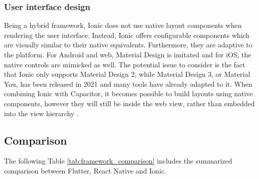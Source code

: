 \subsubsection*{User interface design}

Being a hybrid framework, Ionic does not use native layout components when rendering the user interface. Instead, Ionic offers configurable components which are visually similar to their native equivalents. Furthermore, they are adaptive to the platform. For Android and web, Material Design is imitated and for iOS, the native controls are mimicked as well. The potential issue to consider is the fact that Ionic only supports Material Design 2, while Material Design 3, or Material You, has been released in 2021 and many tools have already adapted to it. When combining Ionic with Capacitor, it becomes possible to build layouts using native components, however they will still be inside the web view, rather than embedded into the view hierarchy \cite{ionic_docs_core_concepts,ionic_blog_capacitor}.

\subsection{Comparison}

The following Table \ref{tab:framework_comparison} includes the summarized comparison between Flutter, React Native and Ionic.

